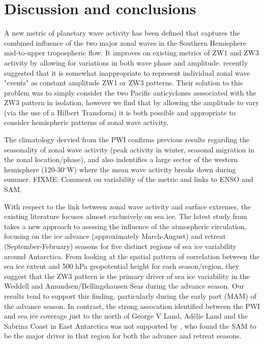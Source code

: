 \section{Discussion and conclusions}

A new metric of planetary wave activity has been defined that captures the combined influence of the two major zonal waves in the Southern Hemisphere mid-to-upper tropospheric flow. It improves on existing metrics of ZW1 and ZW3 activity by allowing for variations in both wave phase and amplitude. \citet{Hobbs2010} recently suggested that it is somewhat inappropriate to represent individual zonal wave "events" as constant amplitude ZW1 or ZW3 patterns. Their solution to this problem was to simply consider the two Pacific anticyclones asssociated with the ZW3 pattern in isolation, however we find that by allowing the amplitude to vary (via the use of a Hilbert Transform) it is both possible and appropriate to consider hemispheric patterns of zonal wave activity.  

The climatology dervied from the PWI confirms previous results regarding the seasonality of zonal wave activity (peak activity in winter, seasonal migration in the zonal location/phase), and also indentifies a large sector of the western hemisphere (120-30$^{\circ}$W) where the mean wave activity breaks down during summer. FIXME: Comment on variability of the metric and links to ENSO and SAM.

With respect to the link between zonal wave activity and surface extremes, the existing literature focuses almost exclusively on sea ice. The latest study from \citet{Raphael2014} takes a new approach to asessing the influence of the atmospheric circulation, focusing on the ice advance (approximately March-August) and retreat (September-February) seasons for five distinct regions of sea ice variability around Antarctica. From looking at the spatial pattern of correlation between the sea ice extent and 500 hPa geopotential height for each season/region, they suggest that the ZW3 pattern is the primary driver of sea ice variability in the Weddell and Amundsen/Bellingshausen Seas during the advance season. Our results tend to support this finding, particularly during the early part (MAM) of the advance season. In contrast, the strong assocation identified between the PWI and sea ice coverage just to the north of George V Land, Ad{\'e}lie Land and the Sabrina Coast in East Antarctica was not supported by \citet{Raphael2014}, who found the SAM to be the major driver in that region for both the advance and retreat seasons. 

